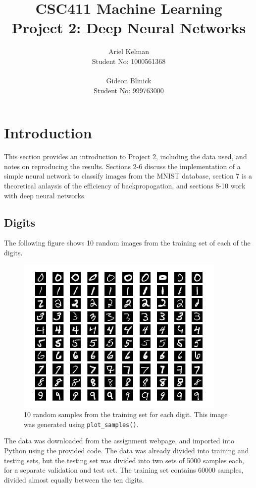 \documentclass{article}
\title{CSC411 Machine Learning \\ Project 2: Deep Neural Networks}
\author{ Ariel Kelman \\ Student No: 1000561368
         \\ \\
         Gideon Blinick \\ Student No: 999763000 }
\begin{document}
   \maketitle{}


   \section{Introduction}
   This section provides an introduction to Project 2, including the data used, and notes
   on reproducing the results. Sections 2-6 discuss the implementation of a simple neural
   network to classify images from the MNIST database, section 7 is a theoretical anlaysis
   of the efficiency of backpropogation, and sections 8-10 work with deep neural networks.

   \subsection{Digits}
   The following figure shows 10 random images from the training set of each of the digits.
   \begin{figure}[H] \centering
      \includegraphics[width=4in]{resources/part1}
      \caption{10 random samples from the training set for each digit. This image
         was generated using \texttt{plot\_samples()}. }
   \end{figure}
   The data was downloaded from the assignment webpage, and imported into Python using the
   provided code. The data was already divided into training and testing sets, but the testing
   set was divided into two sets of 5000 samples each, for a separate validation and test set.
   The training set contains 60000 samples, divided almost equally between the ten digits.
\end{document}
